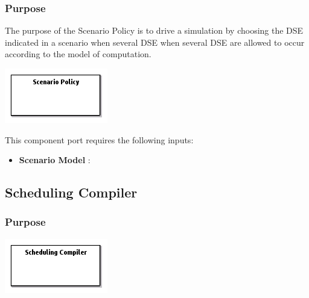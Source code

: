 \documentclass{gemoc} %
\begin{document}
\subsubsection{Purpose}
The purpose of the Scenario Policy is to drive a simulation by choosing the DSE indicated in a scenario when several DSE when several DSE are allowed to occur according to the model of computation.

\begin{center}
\includegraphics*[trim=0.0cm 0.0cm 0cm 0.0cm, clip=true]{../images/generated/Generated_Scenario_Policy.png}
\end{center}

This component port requires the following inputs:
\begin{itemize}
  \item \textbf{Scenario Model} :
\end{itemize}



\subsection{Scheduling Compiler}


\subsubsection{Purpose}


\begin{center}
\includegraphics*[trim=0.0cm 0.0cm 0cm 0.0cm, clip=true]{../images/generated/Generated_Scheduling_Compiler.png}
\end{center}
\end{document}
